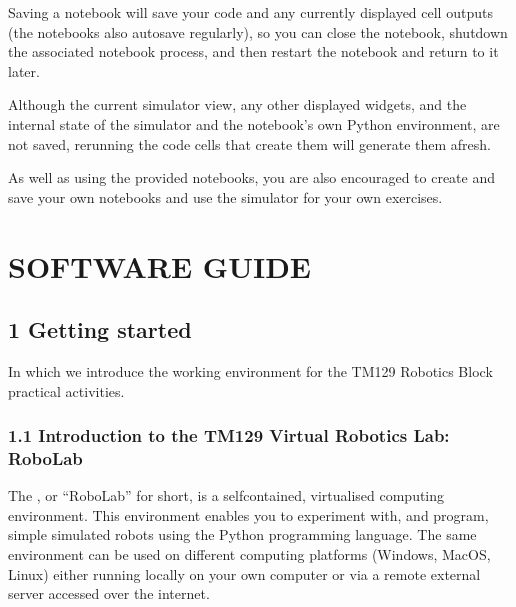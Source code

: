 \documentclass[letterpaper,10pt,english]{sphinxmanual}
\begin{document}
Saving a notebook will save your code and any currently displayed cell outputs (the notebooks also autosave regularly), so you can close the notebook, shutdown the associated notebook process, and then restart the notebook and return to it later.

Although the current simulator view, any other displayed widgets, and the internal state of the simulator and the notebook’s own Python environment, are not saved, rerunning the code cells that create them will generate them afresh.

As well as using the provided notebooks, you are also encouraged to create and save your own notebooks and use the simulator for your own exercises.


\section{SOFTWARE GUIDE}
\label{\detokenize{index:software-guide}}

\subsection{1 Getting started}
\label{\detokenize{content/00_SOFTWARE_GUIDE/Section_00_01_Jupyter_environment:1-Getting-started}}\label{\detokenize{content/00_SOFTWARE_GUIDE/Section_00_01_Jupyter_environment::doc}}
In which we introduce the working environment for the TM129 Robotics Block practical activities.



\subsubsection{1.1 Introduction to the TM129 Virtual Robotics Lab: RoboLab}
\label{\detokenize{content/00_SOFTWARE_GUIDE/Section_00_01_Jupyter_environment:1.1-Introduction-to-the-TM129-Virtual-Robotics-Lab:-RoboLab}}
The , or “RoboLab” for short, is a self\sphinxhyphen{}contained, virtualised computing environment. This environment enables you to experiment with, and program, simple simulated robots using the Python programming language. The same environment can be used on different computing platforms (Windows, MacOS, Linux) either running locally on your own computer or via a remote external server accessed over the internet.
\end{document}
